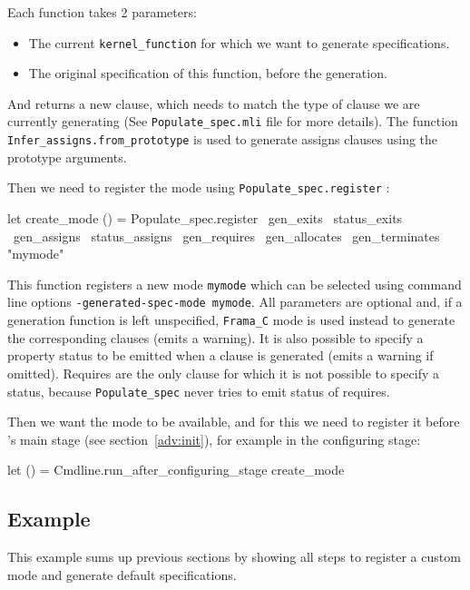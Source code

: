 Each function takes 2 parameters:
\begin{itemize}
  \item The current \verb+kernel_function+ for which we want to generate
  specifications.
  \item The original specification of this function, before the generation.
\end{itemize}
And returns a new clause, which needs to match the type of clause we are
currently generating (See \texttt{Populate\_spec.mli} file for more details).
The function \verb+Infer_assigns.from_prototype+%
 is used to generate assigns
clauses using the prototype arguments.

Then we need to register the mode using \verb+Populate_spec.register+%
:

\begin{ocamlcode}
let create_mode () =
  Populate_spec.register
      ~gen_exits ~status_exits
      ~gen_assigns ~status_assigns
      ~gen_requires
      ~gen_allocates
      ~gen_terminates
      "mymode"
\end{ocamlcode}

This function registers a new mode \verb+mymode+ which can be selected using
command line options \texttt{-generated-spec-mode mymode}. All parameters are
optional and, if a generation function is left unspecified, \texttt{Frama\_C}
mode is used instead to generate the corresponding clauses (emits a warning). It
is also possible to specify a property status to be
emitted when a clause is generated (emits a warning if omitted). Requires are
the only clause for which it is not possible to specify a status, because
\texttt{Populate\_spec} never tries to emit status of
requires.

Then we want the mode to be available, and for this we need to register it
before \framac's main stage (see section~\ref{adv:init}), for example in the
configuring stage:

\begin{ocamlcode}
let () = Cmdline.run_after_configuring_stage create_mode
\end{ocamlcode}

\subsection{Example}\label{subsec:populate}

This example sums up previous sections by showing all steps to register a custom
mode and generate default specifications.

